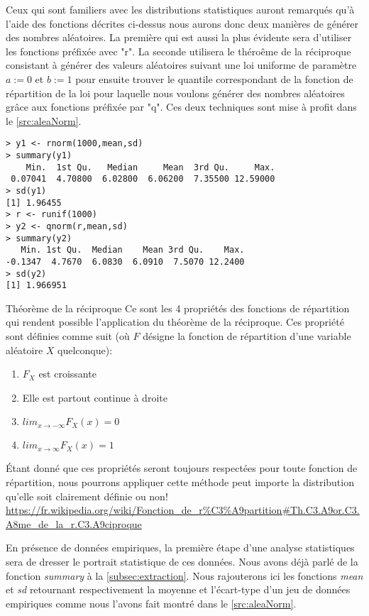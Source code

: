 \noindent
Ceux qui sont familiers avec les distributions statistiques auront remarqués qu'à l'aide des fonctions décrites ci-dessus nous aurons donc deux manières de générer des nombres aléatoires. La première qui est aussi la plus évidente sera d'utiliser les fonctions préfixée avec "r". La seconde utilisera le théroême de la réciproque consistant à générer des valeurs aléatoires suivant une loi uniforme de paramètre $a := 0$ et $b := 1$ pour ensuite trouver le quantile correspondant de la fonction de répartition de la loi pour laquelle nous voulons générer des nombres aléatoires grâce aux fonctions préfixée par "q". Ces deux techniques sont mise à profit dans le \autoref{src:aleaNorm}. \\

\begin{lstlisting}[caption = Génération de nombres aléatoires,label=src:aleaNorm]
> y1 <- rnorm(1000,mean,sd)
> summary(y1)
    Min.  1st Qu.   Median     Mean  3rd Qu.     Max. 
 0.07041  4.70800  6.02800  6.06200  7.35500 12.59000 
> sd(y1)
[1] 1.96455
> r <- runif(1000)
> y2 <- qnorm(r,mean,sd)
> summary(y2)
   Min. 1st Qu.  Median    Mean 3rd Qu.    Max. 
-0.1347  4.7670  6.0830  6.0910  7.5070 12.2400 
> sd(y2)
[1] 1.966951
\end{lstlisting}

\begin{moreInfo}{Théorème de la réciproque}
	Ce sont les 4 propriétés des fonctions de répartition qui rendent possible l'application du théorème de la réciproque. Ces propriété sont définies comme suit (où $F$ désigne la fonction de répartition d'une variable aléatoire $X$ quelconque):
	\begin{enumerate}
		\item $F_X$ est croissante
		\item Elle est partout continue à droite
		\item $lim_{x \rightarrow -\infty} F_X(x) = 0$
		\item $lim_{x \rightarrow \infty} F_X(x) = 1$
	\end{enumerate}
	Étant donné que ces propriétés seront toujours respectées pour toute fonction de répartition, nous pourrons appliquer cette méthode peut importe la distribution qu'elle soit clairement définie ou non!
	\url{https://fr.wikipedia.org/wiki/Fonction_de_r%C3%A9partition#Th.C3.A9or.C3.A8me_de_la_r.C3.A9ciproque}
\end{moreInfo}

\noindent
En présence de données empiriques, la première étape d'une analyse statistiques sera de dresser le portrait statistique de ces données. Nous avons déjà parlé de la fonction \emph{summary} à la \autoref{subsec:extraction}. Nous rajouterons ici les fonctions \emph{mean} et \emph{sd} retournant respectivement la moyenne et l'écart-type d'un jeu de données empiriques comme nous l'avons fait montré dans le \autoref{src:aleaNorm}. \\

